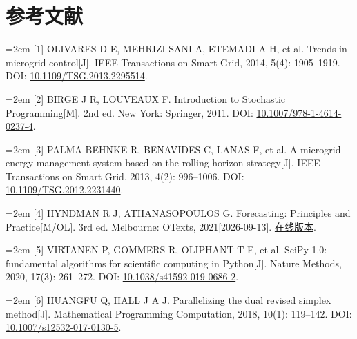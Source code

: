 \documentclass[UTF8,a4paper,zihao=-4,fontset=windows]{ctexart}
\begin{document}
\section{参考文献}
{\small\noindent\hangindent=2em [1] OLIVARES D E, MEHRIZI-SANI A, ETEMADI A H, et al. Trends in microgrid control[J]. IEEE Transactions on Smart Grid, 2014, 5(4): 1905–1919. DOI: \href{https://doi.org/10.1109/TSG.2013.2295514}{10.1109/TSG.2013.2295514}.\par}\vspace{4pt}
{\small\noindent\hangindent=2em [2] BIRGE J R, LOUVEAUX F. Introduction to Stochastic Programming[M]. 2nd ed. New York: Springer, 2011. DOI: \href{https://doi.org/10.1007/978-1-4614-0237-4}{10.1007/978-1-4614-0237-4}.\par}\vspace{4pt}
{\small\noindent\hangindent=2em [3] PALMA-BEHNKE R, BENAVIDES C, LANAS F, et al. A microgrid energy management system based on the rolling horizon strategy[J]. IEEE Transactions on Smart Grid, 2013, 4(2): 996–1006. DOI: \href{https://doi.org/10.1109/TSG.2012.2231440}{10.1109/TSG.2012.2231440}.\par}\vspace{4pt}
{\small\noindent\hangindent=2em [4] HYNDMAN R J, ATHANASOPOULOS G. Forecasting: Principles and Practice[M/OL]. 3rd ed. Melbourne: OTexts, 2021[2026-09-13]. \href{https://otexts.com/fpp3/}{在线版本}.\par}\vspace{4pt}
{\small\noindent\hangindent=2em [5] VIRTANEN P, GOMMERS R, OLIPHANT T E, et al. SciPy 1.0: fundamental algorithms for scientific computing in Python[J]. Nature Methods, 2020, 17(3): 261–272. DOI: \href{https://doi.org/10.1038/s41592-019-0686-2}{10.1038/s41592-019-0686-2}.\par}\vspace{4pt}
{\small\noindent\hangindent=2em [6] HUANGFU Q, HALL J A J. Parallelizing the dual revised simplex method[J]. Mathematical Programming Computation, 2018, 10(1): 119–142. DOI: \href{https://doi.org/10.1007/s12532-017-0130-5}{10.1007/s12532-017-0130-5}.\par}\vspace{4pt}
\clearpage
\end{document}
